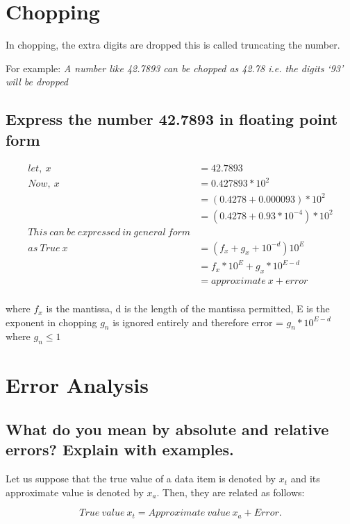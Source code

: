 \documentclass[11pt, a4paper, oneside]{book}
\begin{document}
        \section{Chopping}
          In chopping, the extra digits are dropped this is called truncating the number.

          For example: \textit{A number like 42.7893 can be chopped as 42.78 i.e. the digits `93' will be dropped}

        \subsection*{Express the number 42.7893 in floating point form}

          \begin{align*}
          let,\ x &= 42.7893\\
          Now,\ x &= 0.427893 * 10^2\\
                  &= (0.4278 + 0.000093) * 10^2\\
                  &= (0.4278+0.93 * 10^{-4}) * 10^2\\
          This\ can\ be\ expressed\ in\ general\ form\\ as\ True\
                x &= (f_x + g_x + 10^{-d})10^E\\
                  &= f_x * 10^E + g_x * 10^{E-d}\\
                  &= approximate\ x + error\\
          \end{align*}

          where $f_x$ is the mantissa, d is the length of the mantissa permitted, E is the exponent in chopping $g_n$
          is ignored entirely and therefore error = $g_n * 10^{E-d}$ where $g_n \leq 1$


        \section{Error Analysis}
          \subsection{What do you mean by absolute and relative errors? Explain with examples.}
            Let us suppose that the true value of a data item is denoted by $x_t$ and its approximate value is denoted by
            $x_a$. Then, they are related as follows:

            \begin{equation*}
              True\ value\ x_t = Approximate\ value\ x_a + Error.
            \end{equation*}
\end{document}
